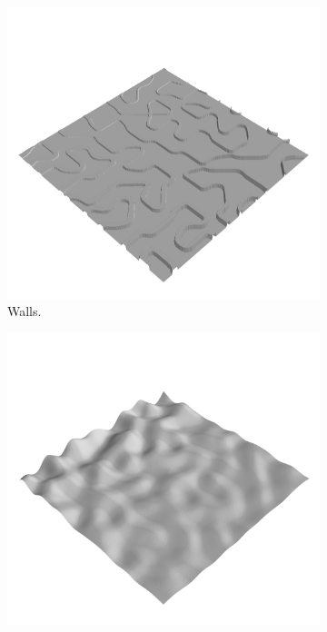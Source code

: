 \documentclass[../document.tex]{subfiles}
\begin{document}
\begin{figure}[htbp]
    \centering
    \begin{subfigure}[b]{0.24\textwidth}
        \includegraphics[width=\linewidth]{../img/hm3d/bars1.png}
        \caption{Walls.}
    \end{subfigure}
    \begin{subfigure}[b]{0.24\textwidth}
        \includegraphics[width=\linewidth]{../img/hm3d/bumps2.png}

\end{subfigure}
\end{figure}
\end{document}
